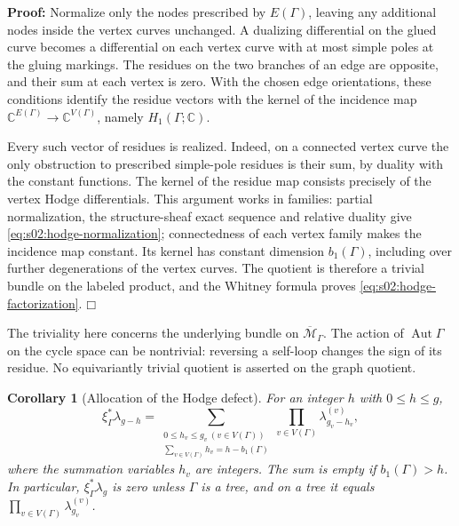 \documentclass[a4paper,10pt]{article}
\numberwithin{equation}{section}
\newcommand{\MM}{\overline{\mathcal{M}}}
\theoremstyle{paperplain}
\newtheorem{crl}[thm]{Corollary}
\theoremstyle{paperremark}
\theoremstyle{paperplain}
\newenvironment{prf}{\noindent \textbf{Proof: }}{\hfill $\mdlgwhtsquare$\par\addvspace{0.5\baselineskip}}
\begin{document}
\begin{prf}
Normalize only the nodes prescribed by $E(\Gamma)$, leaving any
additional nodes inside the vertex curves unchanged.  A dualizing
differential on the glued curve becomes a differential on each vertex
curve with at most simple poles at the gluing markings.  The residues
on the two branches of an edge are opposite, and their sum at each
vertex is zero.  With the chosen edge orientations, these
conditions identify the residue vectors with the kernel of the
incidence map
$\mathbb C^{E(\Gamma)}\to\mathbb C^{V(\Gamma)}$, namely
$H_1(\Gamma;\mathbb C)$.

Every such vector of residues is realized.  Indeed, on a connected
vertex curve the only obstruction to prescribed simple-pole residues
is their sum, by duality with the constant functions.  The kernel of
the residue map consists precisely of the vertex Hodge differentials.
This argument works in families: partial normalization, the
structure-sheaf exact sequence and relative duality give
\eqref{eq:s02:hodge-normalization}; connectedness of each vertex
family makes the incidence map constant.  Its kernel has constant
dimension $b_1(\Gamma)$, including over further degenerations of the
vertex curves.  The quotient is therefore a trivial bundle on the
labeled product, and the Whitney formula proves
\eqref{eq:s02:hodge-factorization}.
\end{prf}

The triviality here concerns the underlying bundle on $\MM_\Gamma$.
The action of $\operatorname{Aut}\Gamma$ on the cycle space can be
nontrivial: reversing a self-loop changes the sign of its residue.
No equivariantly trivial quotient is asserted on the graph quotient.

\begin{crl}[Allocation of the Hodge defect]
\label{crl:s02:defect-allocation}
For an integer $h$ with $0\leq h\leq g$,
\begin{equation}
\label{eq:s02:defect-allocation}
\xi_\Gamma^*\lambda_{g-h}
=\sum_{\substack{0\leq h_v\leq g_v\ (v\in V(\Gamma))\\
\sum_{v\in V(\Gamma)}h_v=h-b_1(\Gamma)}}
\prod_{v\in V(\Gamma)}\lambda_{g_v-h_v}^{(v)},
\end{equation}
where the summation variables $h_v$ are integers.  The sum is empty
if $b_1(\Gamma)>h$.  In particular, $\xi_\Gamma^*\lambda_g$ is zero
unless $\Gamma$ is a tree, and on a tree it equals
$\prod_{v\in V(\Gamma)}\lambda_{g_v}^{(v)}$.
\end{crl}
\end{document}
